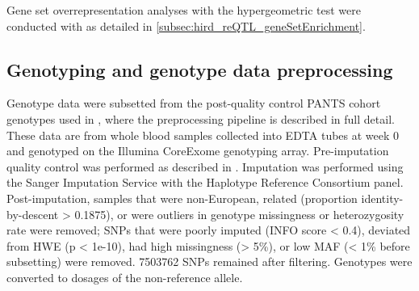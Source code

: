 Gene set overrepresentation analyses with the hypergeometric test were conducted with  as detailed in \cref{subsec:hird_reQTL_geneSetEnrichment}.


\subsection{Genotyping and genotype data preprocessing}

%
%
%
%
%
Genotype data were subsetted from the post-quality control \gls{PANTS} cohort genotypes used in \textcite{sazonovs2019HLADQA105Carriage},
where the preprocessing pipeline is described in full detail.
These data are from whole blood samples collected into EDTA tubes at week 0 and genotyped on the Illumina CoreExome genotyping array.
Pre-imputation quality control was performed as described in \textcite{delange2017GenomewideAssociationStudy}.
Imputation was performed using the Sanger Imputation Service with the Haplotype Reference Consortium panel.
Post-imputation, samples that were non-European, related (proportion identity-by-descent > 0.1875), or were outliers in genotype missingness or heterozygosity rate were removed;
\glspl{SNP} that were poorly imputed (INFO score < 0.4), deviated from \gls{HWE} (p < 1e-10), had high missingness (> 5\%), or low \gls{MAF} (< 1\% before subsetting) were removed.
\num{7503762} \glspl{SNP} remained after filtering.
Genotypes were converted to dosages of the non-reference allele.

